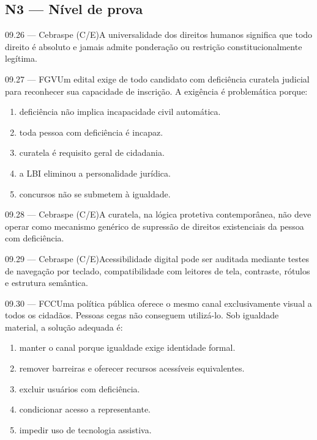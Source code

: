\subsection*{N3 — Nível de prova}
\begin{questao}{ 09.26 — Cebraspe (C/E)}A universalidade dos direitos humanos significa que todo direito é absoluto e jamais admite ponderação ou restrição constitucionalmente legítima.\end{questao}
\begin{questao}{ 09.27 — FGV}Um edital exige de todo candidato com deficiência curatela judicial para reconhecer sua capacidade de inscrição. A exigência é problemática porque:\begin{enumerate}[label=\Alph*)]\item deficiência não implica incapacidade civil automática.\item toda pessoa com deficiência é incapaz.\item curatela é requisito geral de cidadania.\item a LBI eliminou a personalidade jurídica.\item concursos não se submetem à igualdade.\end{enumerate}\end{questao}
\begin{questao}{ 09.28 — Cebraspe (C/E)}A curatela, na lógica protetiva contemporânea, não deve operar como mecanismo genérico de supressão de direitos existenciais da pessoa com deficiência.\end{questao}
\begin{questao}{ 09.29 — Cebraspe (C/E)}Acessibilidade digital pode ser auditada mediante testes de navegação por teclado, compatibilidade com leitores de tela, contraste, rótulos e estrutura semântica.\end{questao}
\begin{questao}{ 09.30 — FCC}Uma política pública oferece o mesmo canal exclusivamente visual a todos os cidadãos. Pessoas cegas não conseguem utilizá-lo. Sob igualdade material, a solução adequada é:\begin{enumerate}[label=\Alph*)]\item manter o canal porque igualdade exige identidade formal.\item remover barreiras e oferecer recursos acessíveis equivalentes.\item excluir usuários com deficiência.\item condicionar acesso a representante.\item impedir uso de tecnologia assistiva.\end{enumerate}\end{questao}
